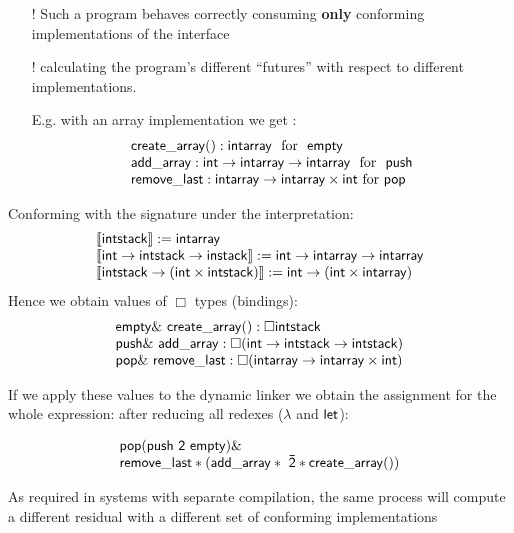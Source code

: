 \documentclass{beamer}
\begin{document}
 \begin{frame}
     \begin{itemize}
   \item[!] Such a program behaves correctly consuming \textbf{only} conforming implementations of the interface 
    \item[!] calculating the program's different “futures” with respect to different implementations.
  
   E.g. with an array implementation we get :
   \[\begin{array}{l} { \sf create\_array(): intarray} \ \ \text{for}\ \ {\sf empty}\\ {\sf add\_array: int \rightarrow intarray\rightarrow intarray}\ \ \text{for} \ \ {\sf push}\\ {\sf remove\_last: intarray\rightarrow intarray\times int }\ \text{for}\ {\sf pop} \end{array} \]
   \end{itemize} 
  \end{frame}
  \begin{frame}
    Conforming with the signature under the interpretation:\\
    
    \[ \begin{array}{l} \llbracket {\sf intstack} \rrbracket:= {\sf intarray} \\ \llbracket {\sf int \rightarrow intstack\rightarrow instack } \rrbracket:= {\sf int \rightarrow intarray\rightarrow intarray} \\ \llbracket {\sf intstack \rightarrow (int \times intstack)} \rrbracket:= {\sf int\rightarrow (int\times intarray)}\\ \end{array} \]
    Hence we obtain values of $\Box$ types (bindings): \\
    
   \[ \begin{array}{l} { \sf empty \& \ create\_array():\Box intstack} \\ {\sf push \&\ add\_array :\Box (int \rightarrow intstack\rightarrow intstack)}\\ {\sf pop \&\ remove\_last: \Box (intarray\rightarrow intarray\times int)} \end{array} \]
   \end{frame}
   \begin{frame}
   If we apply these values to the dynamic linker we obtain the assignment for the whole expression: after reducing all redexes ($\lambda$ and ${\sf let}$):
   
   \[\begin{array}{l l} {\sf pop (push\ 2 \ empty)} \& \\ {\sf remove\_last*(add\_array*\ \bar{2} * create\_array())} \end{array} \]
   
   \alert{ As required in systems with separate compilation, the same process will compute a
    different residual with a different set of conforming implementations}
   \end{frame}
\end{document}
